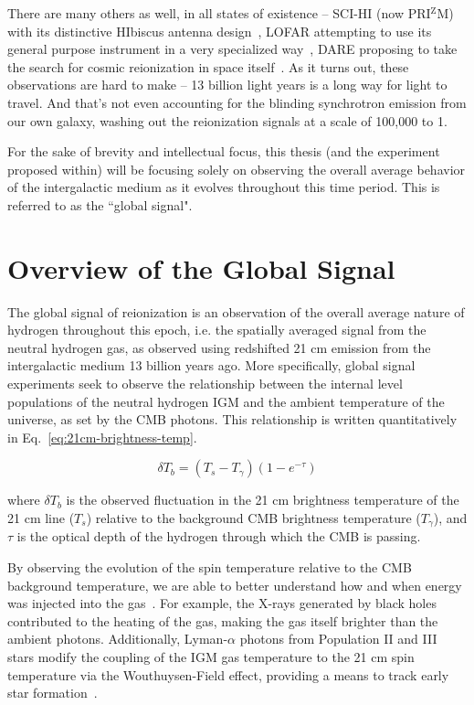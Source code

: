 There are many others as well, in all states of existence -- SCI-HI (now 
PRI$^\mathrm{Z}$M) with its distinctive HIbiscus antenna 
design~\citep{voytek2014}, LOFAR attempting to use its general purpose 
instrument in a very specialized way~\citep{rottgering2006}, DARE proposing to 
take the search for cosmic reionization in space itself~\citep{burns2012}. As 
it turns out, these observations are hard to make -- 13 billion light years is 
a long way for light to travel. And that's not even accounting for the blinding 
synchrotron emission from our own galaxy, washing out the reionization signals 
at a scale of 100,000 to 1.

For the sake of brevity and intellectual focus, this thesis (and the experiment 
proposed within) will be focusing solely on observing the overall average 
behavior of the intergalactic medium as it evolves throughout this time period.  
This is referred to as the ``global signal".

\section{Overview of the Global Signal}
\label{sec:global-signal-overview}

The global signal of reionization is an observation of the overall average 
nature of hydrogen throughout this epoch, i.e. the spatially averaged signal 
from the neutral hydrogen gas, as observed using redshifted 21 cm emission from 
the intergalactic medium 13 billion years ago. More specifically, global signal 
experiments seek to observe the relationship between the internal level 
populations of the neutral hydrogen IGM and the ambient temperature of the 
universe, as set by the CMB photons.  This relationship is written 
quantitatively in Eq.~\eqref{eq:21cm-brightness-temp}.

\begin{equation}
    \delta T_b = (T_s - T_\gamma)(1 - e^{-\tau})
    \label{eq:21cm-brightness-temp}
\end{equation}

\noindent where $\delta T_b$ is the observed fluctuation in the 21 cm 
brightness temperature of the 21 cm line ($T_s$) relative to the background CMB 
brightness temperature ($T_\gamma$), and $\tau$ is the optical depth of the 
hydrogen through which the CMB is passing. 

By observing the evolution of the spin temperature relative to the CMB 
background temperature, we are able to better understand how and when energy 
was injected into the gas~\citep{pritchard-loeb2010}. For example, the X-rays 
generated by black holes contributed to the heating of the gas, making the gas 
itself brighter than the ambient photons. Additionally, Lyman-$\alpha$ photons 
from Population II and III stars modify the coupling of the IGM gas temperature 
to the 21 cm spin temperature via the Wouthuysen-Field effect, providing a 
means to track early star formation~\citep{furlanetto2006}.

